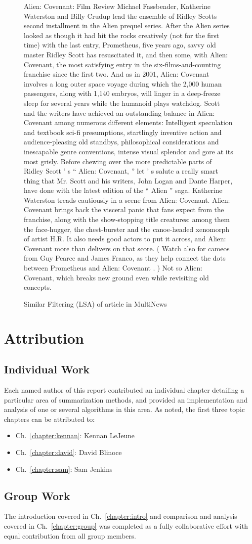 \documentclass[../writeup.tex]{subfiles}
\begin{document}
\begin{figure}[h]
    \centering
    {\small Alien: Covenant: Film Review Michael Fassbender, Katherine Waterston and Billy Crudup lead the ensemble of Ridley Scotts second installment in the Alien prequel series. After the Alien series looked as though it had hit the rocks creatively (not for the first time) with the last entry, Prometheus, five years ago, savvy old master Ridley Scott has resuscitated it, and then some, with Alien: Covenant, the most satisfying entry in the six-films-and-counting franchise since the first two. And as in 2001, Alien: Covenant involves a long outer space voyage during which the 2,000 human passengers, along with 1,140 embryos, will linger in a deep-freeze sleep for several years while the humanoid plays watchdog. Scott and the writers have achieved an outstanding balance in Alien: Covenant among numerous different elements: Intelligent speculation and textbook sci-fi presumptions, startlingly inventive action and audience-pleasing old standbys, philosophical considerations and inescapable genre conventions, intense visual splendor and gore at its most grisly. Before chewing over the more predictable parts of Ridley Scott ’ s “ Alien: Covenant, ” let ’ s salute a really smart thing that Mr. Scott and his writers, John Logan and Dante Harper, have done with the latest edition of the “ Alien ” saga. Katherine Waterston treads cautiously in a scene from Alien: Covenant. Alien: Covenant brings back the visceral panic that fans expect from the franchise, along with the show-stopping title creatures: among them the face-hugger, the chest-burster and the canoe-headed xenomorph of artist H.R. It also needs good actors to put it across, and Alien: Covenant more than delivers on that score. ( Watch also for cameos from Guy Pearce and James Franco, as they help connect the dots between Prometheus and Alien: Covenant . ) Not so Alien: Covenant, which breaks new ground even while revisiting old concepts.}
    \caption{Similar Filtering (LSA) of article in MultiNews}
    \label{appendix:fig:summaries:filter_multi}
\end{figure}


\chapter{Attribution}
\section{Individual Work}
Each named author of this report contributed an individual chapter
detailing a particular area of summarization methods, and provided
an implementation and analysis of one or several algorithms in this area.
As noted, the first three topic chapters can be attributed to:
\begin{itemize}
    \item Ch.~\ref{chapter:kennan}: Kennan LeJeune
    \item Ch.~\ref{chapter:david}: David Blinoce
    \item Ch.~\ref{chapter:sam}: Sam Jenkins
\end{itemize}

\section{Group Work}
The introduction covered in Ch.~\ref{chapter:intro} and comparison and analysis covered in Ch.~\ref{chapter:group}
was completed as a fully collaborative effort with equal contribution
from all group members.
\end{document}
